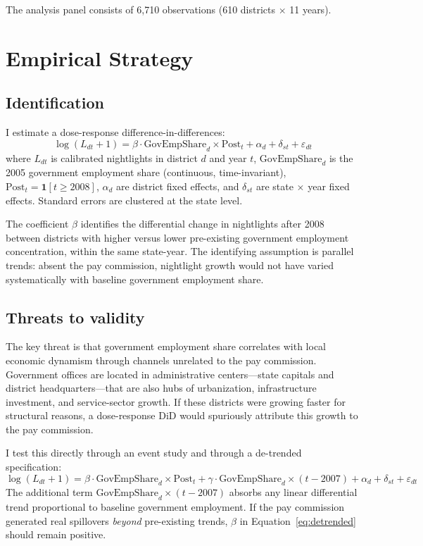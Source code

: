 \documentclass[12pt]{article}
\begin{document}
The analysis panel consists of 6,710 observations (610 districts $\times$ 11 years).



\section{Empirical Strategy}
\label{sec:strategy}

\subsection{Identification}

I estimate a dose-response difference-in-differences:
\begin{equation}
\log(L_{dt} + 1) = \beta \cdot \text{GovEmpShare}_d \times \text{Post}_t + \alpha_d + \delta_{st} + \varepsilon_{dt}
\label{eq:main}
\end{equation}
where $L_{dt}$ is calibrated nightlights in district $d$ and year $t$, $\text{GovEmpShare}_d$ is the 2005 government employment share (continuous, time-invariant), $\text{Post}_t = \mathbf{1}[t \geq 2008]$, $\alpha_d$ are district fixed effects, and $\delta_{st}$ are state $\times$ year fixed effects. Standard errors are clustered at the state level.

The coefficient $\beta$ identifies the differential change in nightlights after 2008 between districts with higher versus lower pre-existing government employment concentration, within the same state-year. The identifying assumption is parallel trends: absent the pay commission, nightlight growth would not have varied systematically with baseline government employment share.

\subsection{Threats to validity}

The key threat is that government employment share correlates with local economic dynamism through channels unrelated to the pay commission. Government offices are located in administrative centers---state capitals and district headquarters---that are also hubs of urbanization, infrastructure investment, and service-sector growth. If these districts were growing faster for structural reasons, a dose-response DiD would spuriously attribute this growth to the pay commission.

I test this directly through an event study and through a de-trended specification:
\begin{equation}
\log(L_{dt} + 1) = \beta \cdot \text{GovEmpShare}_d \times \text{Post}_t + \gamma \cdot \text{GovEmpShare}_d \times (t - 2007) + \alpha_d + \delta_{st} + \varepsilon_{dt}
\label{eq:detrended}
\end{equation}
The additional term $\text{GovEmpShare}_d \times (t - 2007)$ absorbs any linear differential trend proportional to baseline government employment. If the pay commission generated real spillovers \textit{beyond} pre-existing trends, $\beta$ in Equation~\ref{eq:detrended} should remain positive.
\end{document}
